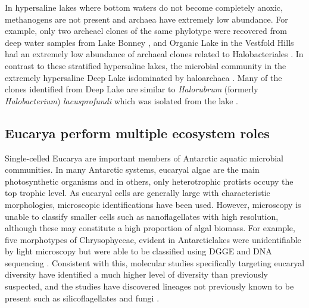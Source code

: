 In hypersaline lakes where bottom waters do not become completely anoxic, methanogens are not present and archaea have extremely low abundance. 
For example, only two archeael clones of the same phylotype were recovered from deep water samples from Lake Bonney \cite{Glatz2006}, 
and Organic Lake in the Vestfold Hills had an extremely low abundance of archaeal clones related to Halobacteriales \cite{Bowman2000b}. 
In contrast to these stratified hypersaline lakes, the microbial community in the extremely hypersaline Deep Lake isdominated by haloarchaea \cite{Bowman2000b}. 
Many of the clones identified from Deep Lake are similar to \textit{Halorubrum} (formerly \textit{Halobacterium}) \textit{lacusprofundi} which was isolated from the lake \cite{Franzmann1988}. 

\subsection{Eucarya perform multiple ecosystem roles}

Single-celled Eucarya are important members of Antarctic aquatic microbial communities.
In many Antarctic systems, eucaryal algae are the main photosynthetic organisms and in others, only heterotrophic protists occupy the top trophic level. 
As eucaryal cells are generally large with characteristic morphologies, microscopic identifications have been used. 
However, microscopy is unable to classify smaller cells such as nanoflagellates with high resolution, although these may constitute a high proportion of algal biomass.
For example, five morphotypes of Chrysophyceae, evident in Antarcticlakes were unidentifiable by light microscopy but were able to be classified using DGGE and DNA sequencing \cite{Unrein2005}.
Consistent with this, molecular studies specifically targeting eucaryal diversity \cite{Unrein2005, Mosier2007, Bielewicz2011} have identified a much higher level of diversity than previously suspected,
 and the studies have discovered lineages not previously known to be present such as silicoflagellates \cite{Unrein2005} and fungi \cite{Mosier2007, Bielewicz2011}.

